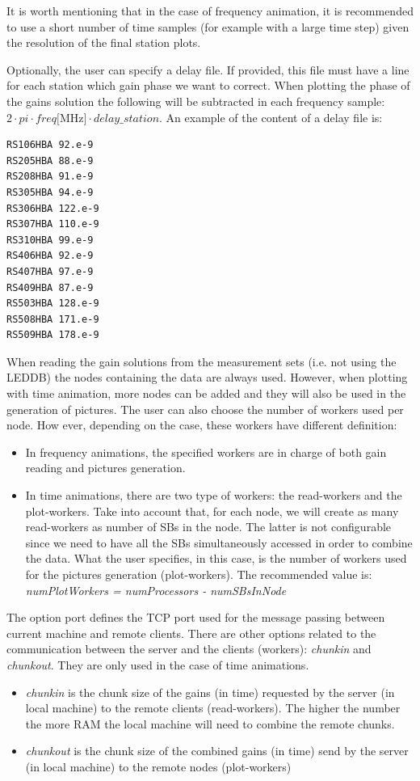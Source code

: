 \documentclass[a4paper,11pt]{article}
\begin{document}
It is worth mentioning that in the case of frequency animation, it is recommended to use a short number of time samples (for example with a large time step) given the resolution of the final station plots.

Optionally, the user can specify a delay file. If provided, this file must have a line for each station which gain phase we want to correct. When plotting the phase of the gains solution the following will be subtracted in each frequency sample: $2 \cdot pi \cdot freq[$MHz$] \cdot delay\_station$. An example of the content of a delay file is:

\begin{small}
\begin{verbatim}
RS106HBA 92.e-9
RS205HBA 88.e-9
RS208HBA 91.e-9
RS305HBA 94.e-9
RS306HBA 122.e-9 
RS307HBA 110.e-9
RS310HBA 99.e-9
RS406HBA 92.e-9
RS407HBA 97.e-9   
RS409HBA 87.e-9
RS503HBA 128.e-9
RS508HBA 171.e-9
RS509HBA 178.e-9
\end{verbatim}
\end{small}

When reading the gain solutions from the measurement sets (i.e. not using the LEDDB) the nodes containing the data are always used. However, when plotting with time animation, more nodes can be added and they will also be used in the generation of pictures. The user can also choose the number of workers used per node. How ever, depending on the case, these workers have different definition:
\begin{itemize}
\item In frequency animations, the specified workers are in charge of both gain reading and pictures generation.
\item In time animations, there are two type of workers: the read-workers and the plot-workers. Take into account that, for each node, we will create as many read-workers as number of SBs in the node. The latter is not configurable since we need to have all the SBs simultaneously accessed in order to combine the data. What the user specifies, in this case, is the number of workers used for the pictures generation (plot-workers). The recommended value is: \textit{numPlotWorkers = numProcessors - numSBsInNode}
\end{itemize}


The option port defines the TCP port used for the message passing between current machine and remote clients. There are other options related to the communication between the server and the clients (workers): \textit{chunkin} and \textit{chunkout}. They are only used in the case of time animations. 
\begin{itemize}
\item \textit{chunkin} is the chunk size of the gains (in time) requested by the server (in local machine) to the remote clients (read-workers). The higher the number the more RAM the local machine will need to combine the remote chunks. 
\item \textit{chunkout} is the chunk size of the combined gains (in time) send by the server (in local machine) to the remote nodes (plot-workers)
\end{itemize}
\end{document}
